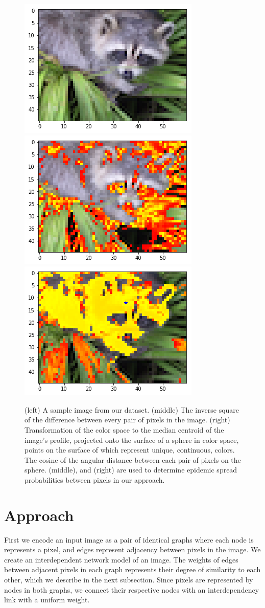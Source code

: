 \documentclass[twocolumn]{article}
\newcommand{\seclab}[1]{\label{sec:#1}}
\newcommand{\figlab}[1]{\label{fig:#1}}
\begin{document}
\begin{figure}[t]
\centering

\includegraphics[width=0.3\linewidth]{figs/input.png}
\includegraphics[width=0.3\linewidth]{figs/alpha.png}
\includegraphics[width=0.3\linewidth]{figs/beta.png}

\caption{
(left) A sample image from our dataset.
(middle) The inverse square of the difference between every pair of pixels in
the image. 
(right) Transformation of the color space to the median centroid of the image's
profile, projected onto the surface of a sphere in color space, points on the
surface of which represent unique, continuous, colors. The cosine of the angular
distance between each pair of pixels on the sphere.
(middle), and (right) are used to determine epidemic spread probabilities
between pixels in our approach.
}
\figlab{alpha_beta}
\end{figure}

\section{Approach}\seclab{approach}

First we encode an input image as a pair of identical graphs where each node is
represents a pixel, and edges represent adjacency between pixels in the image.
We create an interdependent network model of an image. The weights of
edges between adjacent pixels in each graph represents their degree of
similarity to each other, which we describe in the next subsection. Since pixels
are represented by nodes in both graphs, we connect their respective nodes with
an interdependency link with a uniform weight.
\end{document}

